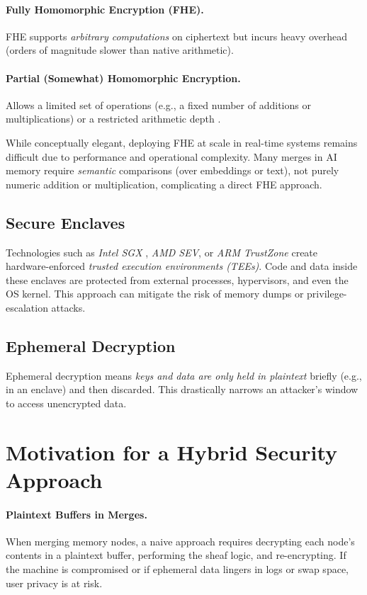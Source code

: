 \documentclass{article}
\begin{document}
\paragraph{Fully Homomorphic Encryption (FHE).}
FHE supports \emph{arbitrary computations} on ciphertext but incurs heavy overhead (orders of magnitude slower than native arithmetic).  
\paragraph{Partial (Somewhat) Homomorphic Encryption.}
Allows a limited set of operations (e.g., a fixed number of additions or multiplications) or a restricted arithmetic depth \citep{halevi2014alg}.

While conceptually elegant, deploying FHE at scale in real-time systems remains difficult due to performance and operational complexity. Many merges in AI memory require \emph{semantic} comparisons (over embeddings or text), not purely numeric addition or multiplication, complicating a direct FHE approach.

\subsection{Secure Enclaves}
Technologies such as \emph{Intel SGX} \citep{costan2016intel}, \emph{AMD SEV}, or \emph{ARM TrustZone} create hardware-enforced \emph{trusted execution environments (TEEs)}. Code and data inside these enclaves are protected from external processes, hypervisors, and even the OS kernel. This approach can mitigate the risk of memory dumps or privilege-escalation attacks.

\subsection{Ephemeral Decryption}
Ephemeral decryption means \emph{keys and data are only held in plaintext} briefly (e.g., in an enclave) and then discarded. This drastically narrows an attacker’s window to access unencrypted data.

\section{Motivation for a Hybrid Security Approach}
\label{sec:motivation_hybrid}

\paragraph{Plaintext Buffers in Merges.}
When merging memory nodes, a naive approach requires decrypting each node’s contents in a plaintext buffer, performing the sheaf logic, and re-encrypting. If the machine is compromised or if ephemeral data lingers in logs or swap space, user privacy is at risk.
\end{document}
